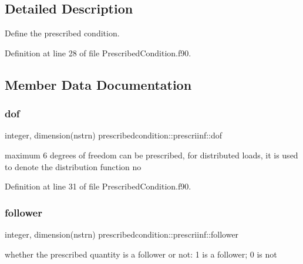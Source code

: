 \subsection{Detailed Description}
Define the prescribed condition. 

Definition at line 28 of file Prescribed\+Condition.\+f90.



\subsection{Member Data Documentation}
\mbox{\label{structprescribedcondition_1_1prescriinf_add1a1e3ab7bef3eaf011f074368c89f8}} 
\subsubsection{\texorpdfstring{dof}{dof}}
{\footnotesize\ttfamily integer, dimension(nstrn) prescribedcondition\+::prescriinf\+::dof\hspace{0.3cm}{\ttfamily [private]}}



maximum 6 degrees of freedom can be prescribed, for distributed loads, it is used to denote the distribution function no 



Definition at line 31 of file Prescribed\+Condition.\+f90.

\mbox{\label{structprescribedcondition_1_1prescriinf_a7e97cae9888b22f4229b56b3a0d2e3b1}} 
\subsubsection{\texorpdfstring{follower}{follower}}
{\footnotesize\ttfamily integer, dimension(nstrn) prescribedcondition\+::prescriinf\+::follower\hspace{0.3cm}{\ttfamily [private]}}



whether the prescribed quantity is a follower or not\+: 1 is a follower; 0 is not 



